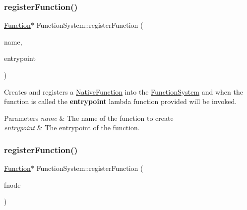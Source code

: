 \mbox{\label{classFunctionSystem_a975b09fef826151dd66dece595aa452b}} 
\subsubsection{\texorpdfstring{register\+Function()}{registerFunction()}\hspace{0.1cm}{\footnotesize\ttfamily [1/2]}}
{\footnotesize\ttfamily \hyperlink{classFunction}{Function}$\ast$ Function\+System\+::register\+Function (\begin{DoxyParamCaption}\item[{std\+::string}]{name,  }\item[{std\+::function$<$ void(std\+::vector$<$ \hyperlink{classValue}{Value} $>$ values, \hyperlink{classValue}{Value} $\ast$return\+\_\+value, std\+::shared\+\_\+ptr$<$ \hyperlink{classObject}{Object} $>$ object)$>$}]{entrypoint }\end{DoxyParamCaption})}

Creates and registers a \hyperlink{classNativeFunction}{Native\+Function} into the \hyperlink{classFunctionSystem}{Function\+System} and when the function is called the {\bfseries entrypoint} lambda function provided will be invoked. 
\begin{DoxyParams}{Parameters}
{\em name} & The name of the function to create \\
\hline
{\em entrypoint} & The entrypoint of the function. \\
\hline
\end{DoxyParams}
\mbox{\label{classFunctionSystem_a1a3d54c912c91ea7656cc5a6185a9a6f}} 
\subsubsection{\texorpdfstring{register\+Function()}{registerFunction()}\hspace{0.1cm}{\footnotesize\ttfamily [2/2]}}
{\footnotesize\ttfamily \hyperlink{classFunction}{Function}$\ast$ Function\+System\+::register\+Function (\begin{DoxyParamCaption}\item[{\hyperlink{classFunctionNode}{Function\+Node} $\ast$}]{fnode }\end{DoxyParamCaption})}

